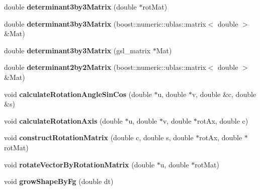 \begin{DoxyCompactItemize}
\item 
\hypertarget{classShapeBase_ade98a5910e7b81ee22da6bcb91262328}{}double {\bfseries determinant3by3\+Matrix} (double $\ast$rot\+Mat)\label{classShapeBase_ade98a5910e7b81ee22da6bcb91262328}

\item 
\hypertarget{classShapeBase_ad86161effaf1c7c607aba51609a99e70}{}double {\bfseries determinant3by3\+Matrix} (boost\+::numeric\+::ublas\+::matrix$<$ double $>$ \&Mat)\label{classShapeBase_ad86161effaf1c7c607aba51609a99e70}

\item 
\hypertarget{classShapeBase_af52dce091d2e8369f546df9adeb1e6c0}{}double {\bfseries determinant3by3\+Matrix} (gsl\+\_\+matrix $\ast$Mat)\label{classShapeBase_af52dce091d2e8369f546df9adeb1e6c0}

\item 
\hypertarget{classShapeBase_a32f1a594c4be91e71f567cc04290a7f5}{}double {\bfseries determinant2by2\+Matrix} (boost\+::numeric\+::ublas\+::matrix$<$ double $>$ \&Mat)\label{classShapeBase_a32f1a594c4be91e71f567cc04290a7f5}

\item 
\hypertarget{classShapeBase_a7c656b4d72103a222e3d9d4d4dc636ca}{}void {\bfseries calculate\+Rotation\+Angle\+Sin\+Cos} (double $\ast$u, double $\ast$v, double \&c, double \&s)\label{classShapeBase_a7c656b4d72103a222e3d9d4d4dc636ca}

\item 
\hypertarget{classShapeBase_acfd90d8e14946c7246e4420ca0ab6a0a}{}void {\bfseries calculate\+Rotation\+Axis} (double $\ast$u, double $\ast$v, double $\ast$rot\+Ax, double c)\label{classShapeBase_acfd90d8e14946c7246e4420ca0ab6a0a}

\item 
\hypertarget{classShapeBase_ac5ea30d81c19c9f7c904af66310c750b}{}void {\bfseries construct\+Rotation\+Matrix} (double c, double s, double $\ast$rot\+Ax, double $\ast$rot\+Mat)\label{classShapeBase_ac5ea30d81c19c9f7c904af66310c750b}

\item 
\hypertarget{classShapeBase_ad803a237b7e7c06d419a308625a599e0}{}void {\bfseries rotate\+Vector\+By\+Rotation\+Matrix} (double $\ast$u, double $\ast$rot\+Mat)\label{classShapeBase_ad803a237b7e7c06d419a308625a599e0}

\item 
\hypertarget{classShapeBase_aa83e1b27ea3a67b958afd06f9095e0de}{}void {\bfseries grow\+Shape\+By\+Fg} (double dt)\label{classShapeBase_aa83e1b27ea3a67b958afd06f9095e0de}


\end{DoxyCompactItemize}
